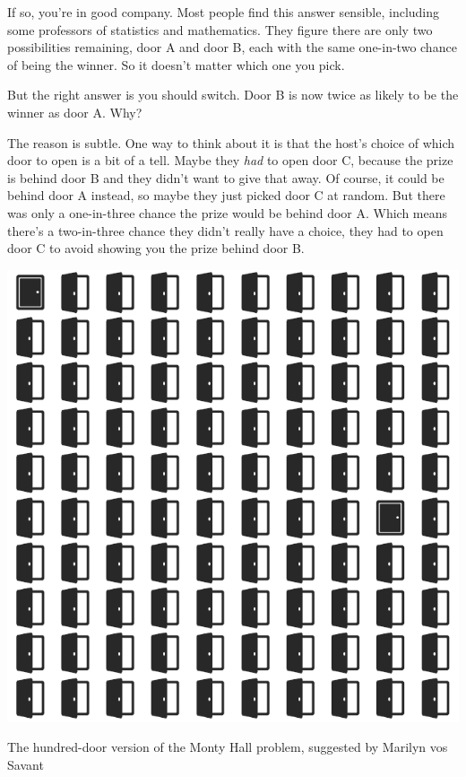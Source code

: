 \documentclass[justified]{tufte-book}
\theoremstyle{definition}
\theoremstyle{definition}
\theoremstyle{definition}
\theoremstyle{remark}
\begin{document}
If so, you're in good company. Most people find this answer sensible,
including some professors of statistics and mathematics. They figure
there are only two possibilities remaining, door A and door B, each with
the same one-in-two chance of being the winner. So it doesn't matter
which one you pick.

But the right answer is you should switch. Door B is now twice as likely
to be the winner as door A. Why?

The reason is subtle. One way to think about it is that the host's
choice of which door to open is a bit of a tell. Maybe they \emph{had}
to open door C, because the prize is behind door B and they didn't want
to give that away. Of course, it could be behind door A instead, so
maybe they just picked door C at random. But there was only a
one-in-three chance the prize would be behind door A. Which means
there's a two-in-three chance they didn't really have a choice, they had
to open door C to avoid showing you the prize behind door B.

\begin{marginfigure}
\includegraphics{_main_files/figure-latex/montygrid-1} \caption[The hundred-door version of the Monty Hall problem, suggested by Marilyn vos Savant]{The hundred-door version of the Monty Hall problem, suggested by Marilyn vos Savant}\label{fig:montygrid}
\end{marginfigure}
\end{document}
